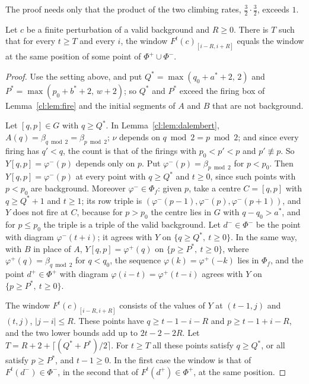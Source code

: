 The proof needs only that the product of the two climbing rates, $\frac32\cdot\frac32$, exceeds $1$.

\begin{proposition}[separation]\label{cl:prop:sep}
Let $c$ be a finite perturbation of a valid background and $R\ge0$. There is $T$ such that for every $t\ge T$ and every $i$, the window $F^t(c)_{[i-R,i+R]}$ equals the window at the same position of some point of $\Phi^+\cup\Phi^-$.
\end{proposition}

\begin{proof}
Use the setting above, and put $Q^*=\max(q_0+a^*+2,\,2)$ and $P^*=\max(p_0+b^*+2,\,w+2)$; so $Q^*$ and $P^*$ exceed the firing box of Lemma~\ref{cl:lem:fire} and the initial segments of $A$ and $B$ that are not background.

Let $[q,p]\in G$ with $q\ge Q^*$. In Lemma~\ref{cl:lem:dalembert}, $A(q)=\beta_{q\bmod2}=\beta_{p\bmod2}$; $\nu$ depends on $q\bmod2=p\bmod2$; and since every firing has $q'<q$, the count is that of the firings with $p_0<p'<p$ and $p'\not\equiv p$. So $Y[q,p]=\varphi^-(p)$ depends only on $p$. Put $\varphi^-(p)=\beta_{p\bmod2}$ for $p<p_0$. Then $Y[q,p]=\varphi^-(p)$ at every point with $q\ge Q^*$ and $t\ge0$, since such points with $p<p_0$ are background. Moreover $\varphi^-\in\Phi_f$: given $p$, take a centre $C=[q,p]$ with $q\ge Q^*+1$ and $t\ge1$; its row triple is $(\varphi^-(p-1),\varphi^-(p),\varphi^-(p+1))$, and $Y$ does not fire at $C$, because for $p>p_0$ the centre lies in $G$ with $q-q_0>a^*$, and for $p\le p_0$ the triple is a triple of the valid background. Let $d^-\in\Phi^-$ be the point with diagram $\varphi^-(t+i)$; it agrees with $Y$ on $\{q\ge Q^*,\ t\ge0\}$. In the same way, with $B$ in place of $A$, $Y[q,p]=\varphi^+(q)$ on $\{p\ge P^*,\ t\ge0\}$, where $\varphi^+(q)=\beta_{q\bmod2}$ for $q<q_0$, the sequence $\varphi(k)=\varphi^+(-k)$ lies in $\Phi_f$, and the point $d^+\in\Phi^+$ with diagram $\varphi(i-t)=\varphi^+(t-i)$ agrees with $Y$ on $\{p\ge P^*,\ t\ge0\}$.

The window $F^t(c)_{[i-R,i+R]}$ consists of the values of $Y$ at $(t-1,j)$ and $(t,j)$, $|j-i|\le R$. These points have $q\ge t-1-i-R$ and $p\ge t-1+i-R$, and the two lower bounds add up to $2t-2-2R$. Let $T=R+2+\lceil(Q^*+P^*)/2\rceil$. For $t\ge T$ all these points satisfy $q\ge Q^*$, or all satisfy $p\ge P^*$, and $t-1\ge0$. In the first case the window is that of $F^t(d^-)\in\Phi^-$, in the second that of $F^t(d^+)\in\Phi^+$, at the same position.
\end{proof}

